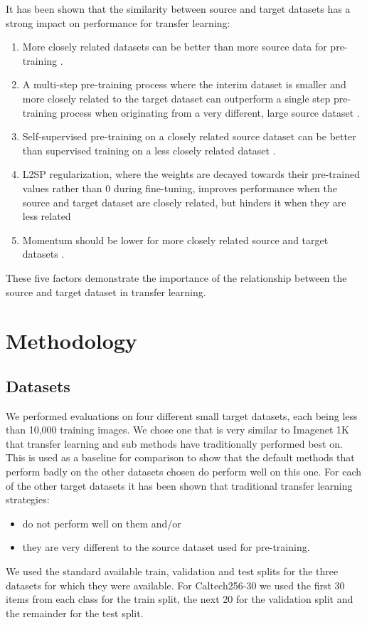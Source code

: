 \documentclass[]{article}
\begin{document}
It has been shown that the similarity between source and target datasets has a strong impact on performance for transfer learning:
\begin{enumerate}
\item More closely related datasets can be better than more source data
for pre-training \cite{ngiam2018domain,mahajan2018exploring,cui2018large,ge2017borrowing,sabatelli2018deep}.
\item A multi-step pre-training process where the interim dataset is smaller
and more closely related to the target dataset can outperform a single
step pre-training process when originating from a very different, large
source dataset \cite{ng2015deep}. 
\item Self-supervised pre-training on a closely related source dataset can
be better than supervised training on a less closely related dataset
\cite{zoph2020rethinking}. 
\item L2SP regularization, where the weights are decayed towards their pre-trained
values rather than 0 during fine-tuning, improves performance when
the source and target dataset are closely related, but hinders it
when they are less related \cite{li2018explicit,li2019delta,wan2019towards}
\item Momentum should be lower for more closely related source and target datasets  \cite{li2020rethinking}.
\end{enumerate}

These five factors demonstrate the importance of the relationship
between the source and target dataset in transfer learning. 

\section{Methodology}

\subsection{Datasets}

We performed evaluations on four different small target datasets,
each being less than 10,000 training images. We chose one that is
very similar to Imagenet 1K that transfer learning and sub methods
have traditionally performed best on. This is used as a baseline for
comparison to show that the default methods that perform badly on
the other datasets chosen do perform well on this one. For each of
the other target datasets it has been shown that traditional transfer
learning strategies: 
\begin{itemize}
\item do not perform well on them and/or 
\item they are very different to the source dataset used for pre-training. 
\end{itemize}
We used the standard available train, validation and test splits for the three datasets for which they were available. For Caltech256-30 we used the first 30 items from each class for the train split, the next 20 for the validation split and the remainder for the test split.
\end{document}
